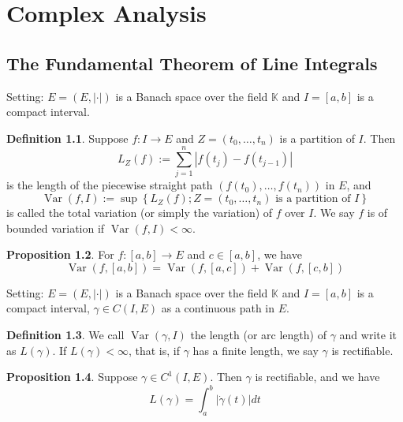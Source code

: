 \documentclass[12pt,a4paper]{book}
\theoremstyle{definition}
\newtheorem{defn}{Definition}[section]
\newtheorem{prop}[defn]{Proposition}
\begin{document}
\chapter{Complex Analysis}
\section{The Fundamental Theorem of Line Integrals}
Setting: $E=(E,|\cdot|)$ is a Banach space over the field $\mathbb{K}$ and $I=[a, b]$ is a compact interval.
\begin{defn}
    Suppose $f: I \rightarrow E$ and $Z=\left(t_0, \ldots, t_n\right)$ is a partition of $I$. Then
    $$
    L_{Z}(f):=\sum_{j=1}^n\left|f\left(t_j\right)-f\left(t_{j-1}\right)\right|
    $$
    is the length of the piecewise straight path $\left(f\left(t_0\right), \ldots, f\left(t_n\right)\right)$ in $E$, and
    $$
    \operatorname{Var}(f, I):=\sup \left\{L_{Z}(f) ; Z=\left(t_0, \ldots, t_n\right) \text { is a partition of } I\right\}
    $$
    is called the total variation (or simply the variation) of $f$ over $I$. We say $f$ is of bounded variation if $\operatorname{Var}(f, I)<\infty$.

\end{defn}
\begin{prop}
    For $f:[a, b] \rightarrow E$ and $c \in[a, b]$, we have
    $$
    \operatorname{Var}(f,[a, b])=\operatorname{Var}(f,[a, c])+\operatorname{Var}(f,[c, b])
    $$
\end{prop}
Setting: $E=(E,|\cdot|)$ is a Banach space over the field $\mathbb{K}$ and $I=[a, b]$ is a compact interval, 
$\gamma \in C(I, E)$ as a continuous path in $E$.
\begin{defn}
    We call $\operatorname{Var}(\gamma, I)$ the length (or arc length) of $\gamma$ and write it as $L(\gamma)$. If $L(\gamma)<\infty$, that is, if $\gamma$ has a finite length, we say $\gamma$ is rectifiable.  
\end{defn}
\begin{prop}
Suppose $\gamma \in C^1(I, E)$. Then $\gamma$ is rectifiable, and we have
$$
L(\gamma)=\int_a^b|\dot{\gamma}(t)| d t
$$
\end{prop}
\end{document}
